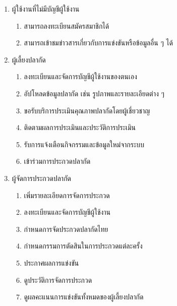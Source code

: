 

\begin{enumerate}
	\item ผู้ใช้งานที่ไม่มีบัญชีผู้ใช้งาน
	\begin{enumerate}
		\item สามารถลงทะเบียนสมัครสมาชิกได้
		\item สามารถเข้าชมข่าวสารเกี่ยวกับการแข่งขันหรือข้อมูลอื่น ๆ ได้
	\end{enumerate}
	
	\item ผู้เลี้ยงปลากัด
	\begin{enumerate}
		\item ลงทะเบียนและจัดการบัญชีผู้ใช้งานของตนเอง
		\item อัปโหลดข้อมูลปลากัด เช่น รูปภาพและรายละเอียดต่าง ๆ
		\item ขอรับบริการประเมินคุณภาพปลากัดโดยผู้เชี่ยวชาญ
		\item ติดตามผลการประเมินและประวัติการประเมิน
		\item รับการแจ้งเตือนกิจกรรมและข้อมูลใหม่จากระบบ
		\item เข้าร่วมการประกวดปลากัด
	\end{enumerate}
	
	\item ผู้จัดการประกวดปลากัด
	\begin{enumerate}
		\item เพิ่มรายละเอียดการจัดการประกวด
		\item ลงทะเบียนและจัดการบัญชีผู้ใช้งาน
		\item กำหนดการจัดประกวดปลากัดไทย
		\item กำหนดกรรมการตัดสินในการประกวดแต่ละครั้ง
		\item ประกาศผลการแข่งขัน
		\item ดูประวัติการจัดการประกวด
		\item ดูผลคะแนนการแข่งขันทั้งหมดของผู้เลี้ยงปลากัด
	\end{enumerate}
	

\end{enumerate}
